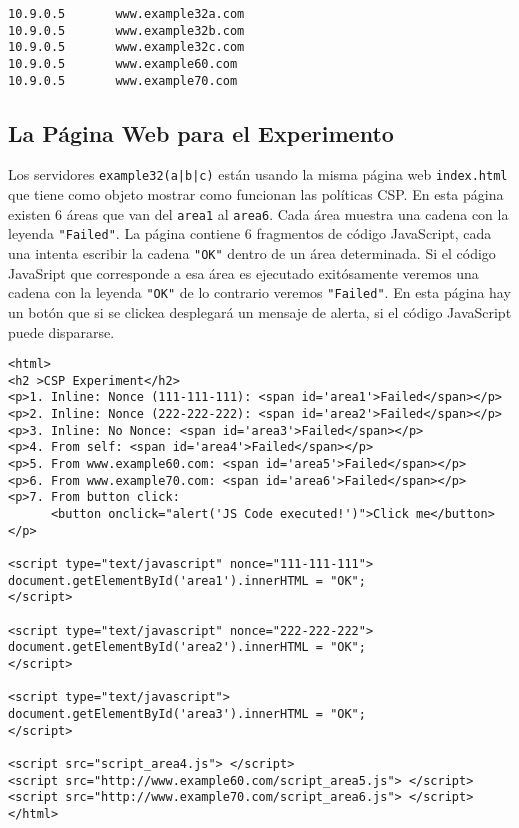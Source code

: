 \begin{lstlisting}
10.9.0.5       www.example32a.com
10.9.0.5       www.example32b.com
10.9.0.5       www.example32c.com
10.9.0.5       www.example60.com
10.9.0.5       www.example70.com
\end{lstlisting}


\subsection{La Página Web para el Experimento}

Los servidores \texttt{example32(a|b|c)} están usando la misma página web \texttt{index.html} que tiene como objeto mostrar como funcionan las políticas CSP.
En esta página existen 6 áreas que van del \texttt{area1} al \texttt{area6}.
Cada área muestra una cadena con la leyenda \texttt{"Failed"}. La página contiene 6 fragmentos de código JavaScript, cada una intenta escribir la cadena \texttt{"OK"} dentro de un área determinada. Si el código JavaSript que corresponde a esa área es ejecutado exitósamente veremos una cadena con la leyenda \texttt{"OK"} de lo contrario veremos \texttt{"Failed"}. En esta página hay un botón que si se clickea desplegará un mensaje de alerta, si el código JavaScript puede dispararse.


\begin{lstlisting}[caption={The experiment web page \texttt{index.html}}]
<html>
<h2 >CSP Experiment</h2>
<p>1. Inline: Nonce (111-111-111): <span id='area1'>Failed</span></p>
<p>2. Inline: Nonce (222-222-222): <span id='area2'>Failed</span></p>
<p>3. Inline: No Nonce: <span id='area3'>Failed</span></p>
<p>4. From self: <span id='area4'>Failed</span></p>
<p>5. From www.example60.com: <span id='area5'>Failed</span></p>
<p>6. From www.example70.com: <span id='area6'>Failed</span></p>
<p>7. From button click: 
      <button onclick="alert('JS Code executed!')">Click me</button></p>

<script type="text/javascript" nonce="111-111-111">
document.getElementById('area1').innerHTML = "OK";
</script>

<script type="text/javascript" nonce="222-222-222">
document.getElementById('area2').innerHTML = "OK";
</script>

<script type="text/javascript">
document.getElementById('area3').innerHTML = "OK";
</script>

<script src="script_area4.js"> </script>
<script src="http://www.example60.com/script_area5.js"> </script>
<script src="http://www.example70.com/script_area6.js"> </script>
</html>

\end{lstlisting}
 


